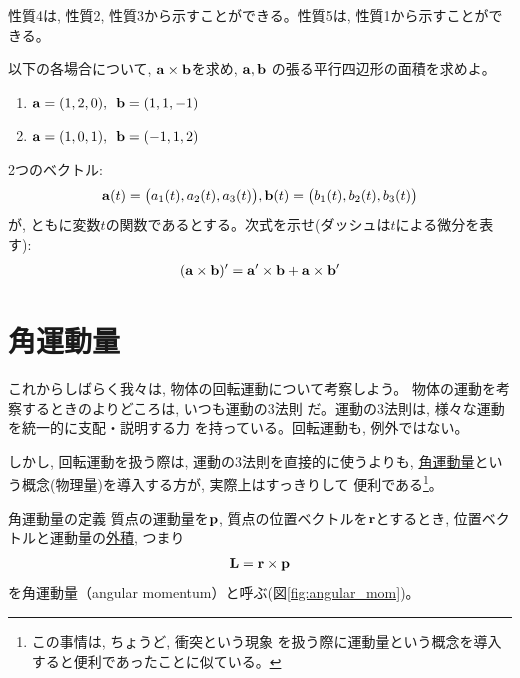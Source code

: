 性質4は, 性質2, 性質3から示すことができる。性質5は, 性質1から示すことができる。\mv

\begin{q}\label{q:univ_vectprod0_phys} 以下の各場合について, ${\bf a}\times{\bf b}$を求め, ${\bf a}, {\bf b}$
の張る平行四辺形の面積を求めよ。
\begin{enumerate}
\item ${\bf a}=(1, 2, 0),\,\,\, {\bf b}=(1, 1, -1)$
\item ${\bf a}=(1, 0, 1),\,\,\, {\bf b}=(-1, 1, 2)$
\end{enumerate}\end{q}

\begin{q}\label{q:vect_vecprod_diff_phys} 2つのベクトル: 
\begin{eqnarray*}
{\bf a}(t)=\bigl(a_1(t), a_2(t), a_3(t)\bigr), 
{\bf b}(t)=\bigl(b_1(t), b_2(t), b_3(t)\bigr)
\end{eqnarray*}
が, ともに変数$t$の関数であるとする。次式を示せ(ダッシュは$t$による微分を表す):
\begin{eqnarray}
({\bf a}\times{\bf b})'={\bf a}'\times{\bf b}+{\bf a}\times{\bf b}'\label{eq:vect_vecprod_diff_phys}
\end{eqnarray}
\end{q}
\hv


\section{角運動量}

これからしばらく我々は, 物体の回転運動について考察しよう。
物体の運動を考察するときのよりどころは, いつも運動の3法則
だ。運動の3法則は, 様々な運動を統一的に支配・説明する力
を持っている。回転運動も, 例外ではない。

しかし, 回転運動を扱う際は, 運動の3法則を直接的に使うよりも, 
\underline{角運動量}という概念(物理量)を導入する方が, 実際上はすっきりして
便利である\footnote{この事情は, ちょうど, 衝突という現象
を扱う際に運動量という概念を導入すると便利であったことに似ている。}。

\begin{itembox}{角運動量の定義}
質点の運動量を${\bf p}$, 質点の位置ベクトルを${\bf r}$とするとき, 
位置ベクトルと運動量の\underline{外積}, つまり
\begin{eqnarray} 
{\bf L}={\bf r}\times{\bf p}\label{eq:def_angmom}
\end{eqnarray} 
を角運動量（angular momentum）と呼ぶ(図\ref{fig:angular_mom})。
\end{itembox}

